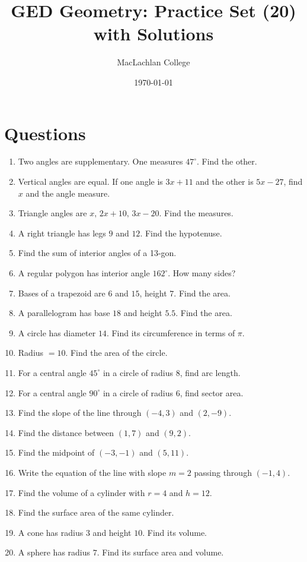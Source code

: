 \documentclass[11pt]{article}
\title{GED Geometry: Practice Set (20) with Solutions}
\author{MacLachlan College}
\date{\today}
\newcommand{\degree}{^\circ}
\begin{document}
\maketitle

\section*{Questions}
\begin{enumerate}
\item Two angles are supplementary. One measures \(47\degree\). Find the other.
\item Vertical angles are equal. If one angle is \(3x+11\) and the other is \(5x-27\), find \(x\) and the angle measure.
\item Triangle angles are \(x,\,2x+10,\,3x-20\). Find the measures.
\item A right triangle has legs \(9\) and \(12\). Find the hypotenuse.

\item Find the sum of interior angles of a 13-gon.
\item A regular polygon has interior angle \(162\degree\). How many sides?
\item Bases of a trapezoid are \(6\) and \(15\), height \(7\). Find the area.
\item A parallelogram has base \(18\) and height \(5.5\). Find the area.

\item A circle has diameter \(14\). Find its circumference in terms of \(\pi\).
\item Radius \(=10\). Find the area of the circle.
\item For a central angle \(45\degree\) in a circle of radius \(8\), find arc length.
\item For a central angle \(90\degree\) in a circle of radius \(6\), find sector area.

\item Find the slope of the line through \((-4,3)\) and \((2,-9)\).
\item Find the distance between \((1,7)\) and \((9,2)\).
\item Find the midpoint of \(( -3,-1)\) and \((5,11)\).
\item Write the equation of the line with slope \(m=2\) passing through \(( -1,4)\).

\item Find the volume of a cylinder with \(r=4\) and \(h=12\).
\item Find the surface area of the same cylinder.
\item A cone has radius \(3\) and height \(10\). Find its volume.
\item A sphere has radius \(7\). Find its surface area and volume.
\end{enumerate}
\end{document}
